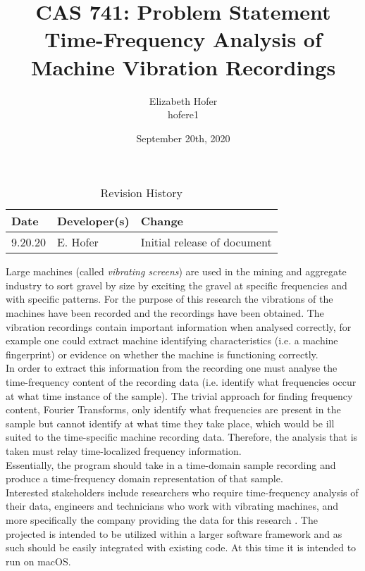 \documentclass{article}
\title{CAS 741: Problem Statement\\Time-Frequency Analysis of Machine Vibration Recordings}
\author{Elizabeth Hofer \\ hofere1}
\date{September 20th, 2020}
\begin{document}
\maketitle

\begin{table}[hp]
\caption{Revision History} \label{TblRevisionHistory}
\begin{tabularx}{\textwidth}{llX}
\toprule
\textbf{Date} & \textbf{Developer(s)} & \textbf{Change}\\
\midrule
9.20.20 & E. Hofer & Initial release of document\\
\bottomrule
\end{tabularx}
\end{table}


Large machines (called \emph{vibrating screens}) are used in the mining and aggregate industry to sort gravel by size by exciting the gravel at specific frequencies and with specific patterns. For the purpose of this research the vibrations of the machines have been recorded and the recordings have been obtained. The vibration recordings contain important information when analysed correctly, for example one could extract machine identifying characteristics (i.e. a machine fingerprint) or evidence on whether the machine is functioning correctly.\\
  
In order to extract this information from the recording one must analyse the time-frequency content of the recording data (i.e. identify what frequencies occur at what time instance of the sample). The trivial approach for finding frequency content, Fourier Transforms, only identify what frequencies are present in the sample but cannot identify at what time they take place, which would be ill suited to the time-specific machine recording data. Therefore, the analysis that is taken must relay time-localized frequency information.\\

Essentially, the program should take in a time-domain sample recording and produce a time-frequency domain representation of that sample.\\

Interested stakeholders include researchers who require time-frequency analysis of their data, engineers and technicians who work with vibrating machines, and more specifically the company providing the data for this research . The projected is intended to be utilized within a larger software framework and as such should be easily integrated with existing code. At this time it is intended to run on macOS. \\
\end{document}
